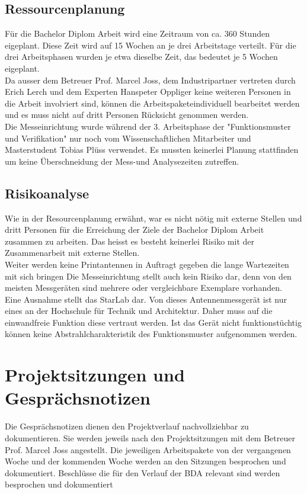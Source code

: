 \subsection{Ressourcenplanung}
Für die Bachelor Diplom Arbeit wird eine Zeitraum von ca. 360 Stunden eigeplant. Diese Zeit wird auf 15 Wochen an je drei Arbeitstage verteilt. Für die drei Arbeitsphasen wurden je etwa dieselbe Zeit, das bedeutet je 5 Wochen eigeplant.\\
Da ausser dem Betreuer Prof. Marcel Joss, dem Industripartner vertreten durch Erich Lerch  und dem Experten Hanspeter Oppliger keine weiteren Personen in die Arbeit involviert sind, können die Arbeitspaketeindividuell bearbeitet werden und es muss nicht auf dritt Personen Rücksicht genommen werden.\\
Die Messeinrichtung wurde während der 3. Arbeitsphase der "Funktionsmuster und Verifikation" nur noch vom Wissenschaftlichen Mitarbeiter und Masterstudent Tobias Plüss verwendet. Es mussten keinerlei Planung stattfinden um keine Überschneidung der Mess-und Analysezeiten zutreffen. 

\subsection{Risikoanalyse}
Wie in der Resourcenplanung erwähnt, war es nicht nötig mit externe Stellen und dritt Personen für die Erreichung der Ziele der Bachelor Diplom Arbeit zusammen zu arbeiten. Das heisst es besteht keinerlei Risiko mit der Zusammenarbeit mit externe Stellen.\\
Weiter werden keine Printantennen in Auftragt gegeben die lange Wartezeiten mit sich bringen
Die Messeinrichtung stellt auch kein Risiko dar, denn von den meisten Messgeräten sind mehrere oder vergleichbare Exemplare vorhanden.\\
Eine Ausnahme stellt das StarLab dar. Von dieses Antennenmessgerät ist nur eines an der Hochschule für Technik und Architektur. Daher muss auf die einwandfreie Funktion diese vertraut werden. Ist das Gerät nicht funktionstüchtig können keine Abstrahlcharakteristik des Funktionsmuster aufgenommen werden.

\section{Projektsitzungen und Gesprächsnotizen}
Die Gesprächsnotizen dienen den Projektverlauf nachvollziehbar zu dokumentieren. Sie werden jeweils nach den Projektsitzungen mit dem Betreuer Prof. Marcel Joss angestellt. Die jeweiligen Arbeitspakete von der vergangenen Woche und der kommenden Woche werden an den Sitzungen besprochen und dokumentiert. Beschlüsse die für den Verlauf der BDA relevant sind werden besprochen und dokumentiert



